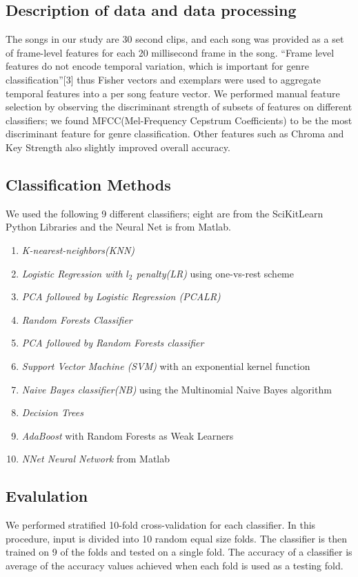 \documentclass{article}
\begin{document}
\begin{multicols}{2}
\subsection{Description of data and data processing}
The songs in our study are 30 second clips, and each song was provided as a set of frame-level features for each 20 millisecond frame in the song. ``Frame level features do not encode temporal variation, which is important for genre classification''[3] thus Fisher vectors and exemplars were used to aggregate temporal features into a per song feature vector. 
We performed manual feature selection by observing the discriminant strength of subsets of features on different classifiers; we found MFCC(Mel-Frequency Cepstrum Coefficients) to be the most discriminant feature for genre classification. Other features such as Chroma and Key Strength also slightly improved overall accuracy. 

\subsection{Classification Methods}
We used the following 9 different classifiers; eight are from the SciKitLearn Python Libraries and the Neural Net is from Matlab. 
\begin{enumerate}
    \item \textit{K-nearest-neighbors(KNN)} 
    \item \textit{Logistic Regression with $l_2$ penalty(LR)} using one-vs-rest scheme 
    \item \textit{PCA followed by Logistic Regression (PCALR)}
    \item \textit{Random Forests Classifier}
    \item \textit{PCA followed by Random Forests classifier}
    \item \textit{Support Vector Machine (SVM)} with an exponential kernel function
    \item \textit{Naive Bayes classifier(NB)} using the Multinomial Naive Bayes algorithm
    \item \textit{Decision Trees} 
    \item \textit{AdaBoost} with Random Forests as Weak Learners
    \item \textit{NNet Neural Network} from Matlab
\end{enumerate}
 
\subsection{Evalulation}
We performed stratified 10-fold cross-validation for each classifier. In this procedure, input is divided into 10 random equal size folds. The classifier is then trained on 9 of the folds and tested on a single fold. The accuracy of a classifier is average of the accuracy values achieved when each fold is used as a testing fold.


\end{multicols}
\end{document}
